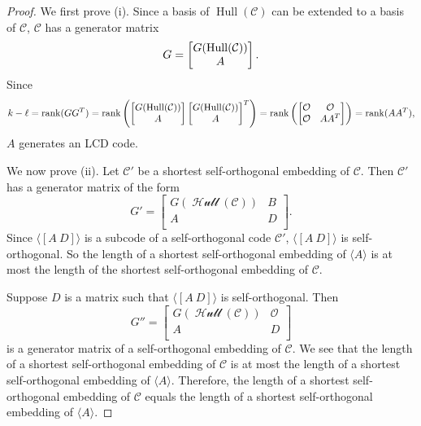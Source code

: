 \documentclass{article}
\theoremstyle{definition}
\theoremstyle{remark}
\begin{document}
\begin{proof}
We first prove (i). Since a basis of $\operatorname{Hull}(\mathcal{C})$ can be extended to a basis of $\mathcal{C}$, $\mathcal{C}$ has a generator matrix
\[
G=\begin{bmatrix}
G(\mathcal {\rm{Hull}}(\mathcal C))  \\
A 
\end{bmatrix}.
\]
Since
\[
k-\ell = \operatorname{rank}(GG^T)=\operatorname{rank}\left(\begin{bmatrix}
G(\mathcal {\rm{Hull}}(\mathcal C))  \\
A 
\end{bmatrix}\begin{bmatrix}
G(\mathcal {\rm{Hull}}(\mathcal C))  \\
A 
\end{bmatrix}^T\right)
=\operatorname{rank}\left(\begin{bmatrix}
    \mathcal{O} & \mathcal{O}\\\mathcal{O} & AA^T
\end{bmatrix}\right)=\operatorname{rank}(AA^T),
\]
$A$ generates an LCD code.

We now prove (ii). Let $\mathcal C'$ be a shortest self-orthogonal embedding of $\mathcal C$. Then $\mathcal C'$ has a generator matrix of the form
\[
G' = \begin{bmatrix}
  G(\mathcal {\operatorname{Hull}}(\mathcal C)) & B \\
A  & D\\
\end{bmatrix}.
\]
Since $\langle[A ~ D]\rangle$ is a subcode of a self-orthogonal code $\mathcal C'$,
  $\langle[A ~ D]\rangle$ is self-orthogonal.  So the length of a shortest self-orthogonal embedding of $\langle A \rangle$ is at most the length of the shortest self-orthogonal embedding of $\mathcal C$.

Suppose $D$ is a matrix such that $\langle [A~ D] \rangle$ is self-orthogonal. Then
\[
G'' =\begin{bmatrix}
 G(\mathcal {\operatorname{Hull}}(\mathcal C)) & \mathcal{O} \\
A  & D\\
\end{bmatrix}
\]
is a generator matrix of a self-orthogonal embedding of $\mathcal C$.  We see that the length of a shortest self-orthogonal embedding of $\mathcal C$ is at most the length of a shortest self-orthogonal embedding of $\langle A \rangle$.  Therefore, the length of a shortest self-orthogonal embedding of $\mathcal C$ equals the length of a shortest self-orthogonal embedding of $\langle A\rangle$.
\end{proof}
\end{document}
